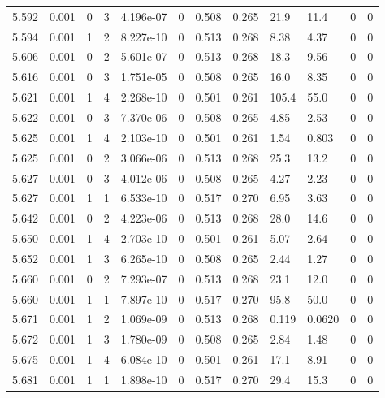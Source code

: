 \documentclass[preview]{standalone}
\begin{document}
{{{{{{{{{{{{{{{\begin{tabular}{L{1.2cm}C{1.2cm} C{0.3cm}C{0.5cm} C{1.4cm}C{1.4cm} C{1.4cm}C{1.4cm} C{1.6cm}C{1.6cm} C{1.6cm}C{1.6cm}}
  5.592  &  0.001  & 0     &  3 &  4.196e-07  & 0  &  0.508&   0.265& 21.9 & 11.4   &  0 & 0  \\ 
  5.594  &  0.001  & 1     &  2 &  8.227e-10  & 0  &  0.513&   0.268& 8.38 & 4.37   &  0 & 0  \\ 
  5.606  &  0.001  & 0     &  2 &  5.601e-07  & 0  &  0.513&   0.268& 18.3 & 9.56   &  0 & 0  \\ 
  5.616  &  0.001  & 0     &  3 &  1.751e-05  & 0  &  0.508&   0.265& 16.0 & 8.35   &  0 & 0  \\ 
  5.621  &  0.001  & 1     &  4 &  2.268e-10  & 0  &  0.501&   0.261& 105.4 & 55.0   &  0 & 0  \\ 
  5.622  &  0.001  & 0     &  3 &  7.370e-06  & 0  &  0.508&   0.265& 4.85 & 2.53   &  0 & 0  \\ 
  5.625  &  0.001  & 1     &  4 &  2.103e-10  & 0  &  0.501&   0.261& 1.54 & 0.803   &  0 & 0  \\ 
  5.625  &  0.001  & 0     &  2 &  3.066e-06  & 0  &  0.513&   0.268& 25.3 & 13.2   &  0 & 0  \\ 
  5.627  &  0.001  & 0     &  3 &  4.012e-06  & 0  &  0.508&   0.265& 4.27 & 2.23   &  0 & 0  \\ 
  5.627  &  0.001  & 1     &  1 &  6.533e-10  & 0  &  0.517&   0.270& 6.95 & 3.63   &  0 & 0  \\ 
  5.642  &  0.001  & 0     &  2 &  4.223e-06  & 0  &  0.513&   0.268& 28.0 & 14.6   &  0 & 0  \\ 
  5.650  &  0.001  & 1     &  4 &  2.703e-10  & 0  &  0.501&   0.261& 5.07 & 2.64   &  0 & 0  \\ 
  5.652  &  0.001  & 1     &  3 &  6.265e-10  & 0  &  0.508&   0.265& 2.44 & 1.27   &  0 & 0  \\ 
  5.660  &  0.001  & 0     &  2 &  7.293e-07  & 0  &  0.513&   0.268& 23.1 & 12.0   &  0 & 0  \\ 
  5.660  &  0.001  & 1     &  1 &  7.897e-10  & 0  &  0.517&   0.270& 95.8 & 50.0   &  0 & 0  \\ 
  5.671  &  0.001  & 1     &  2 &  1.069e-09  & 0  &  0.513&   0.268& 0.119 & 0.0620   &  0 & 0  \\ 
  5.672  &  0.001  & 1     &  3 &  1.780e-09  & 0  &  0.508&   0.265& 2.84 & 1.48   &  0 & 0  \\ 
  5.675  &  0.001  & 1     &  4 &  6.084e-10  & 0  &  0.501&   0.261& 17.1 & 8.91   &  0 & 0  \\ 
  5.681  &  0.001  & 1     &  1 &  1.898e-10  & 0  &  0.517&   0.270& 29.4 & 15.3   &  0 & 0  \\ 

\end{tabular}}}}}}}}}}}}}}}}
\end{document}
